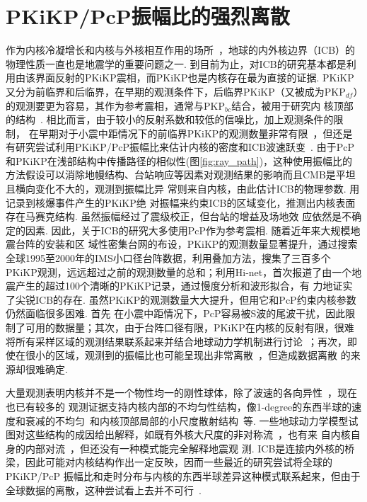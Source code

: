 \section{PKiKP/PcP振幅比的强烈离散}
作为内核冷凝增长和内核与外核相互作用的场所~\citep{Deguen2011,Bergman2010}，地球的内外核边界（ICB）的物理性质一直也是地震学的重要问题之一. 到目前为止，对ICB的研究基本都是利用由该界面反射的PKiKP震相，而PKiKP也是内核存在最为直接的证据. PKiKP又分为前临界和后临界，在早期的观测条件下，后临界PKiKP（又被成为PKP${}_{df}$）的观测要更为容易，其作为参考震相，通常与PKP${}_{bc}$结合，被用于研究内
核顶部的结构~\citep{Tanaka1997}. 相比而言，由于较小的反射系数和较低的信噪比，加上观测条件的限制，
在早期对于小震中距情况下的前临界PKiKP的观测数量非常有限~\citep{Bolt1970}，但还是有研究尝试利用PKiKP/PcP振幅比来估计内核的密度和ICB波速跃变~\citep{Souriau1989,Shearer1990}. 由于PcP和PKiKP在浅部结构中传播路径的相似性(图\ref{fig:ray_path})，这种使用振幅比的
方法假设可以消除地幔结构、台站响应等因素对观测结果的影响而且CMB是平坦且横向变化不大的，观测到振幅比异
常则来自内核，由此估计ICB的物理参数. \citet{Krasnoshchekov2005}用记录到核爆事件产生的PKiKP绝
对振幅来约束ICB的区域变化，推测出内核表面存在马赛克结构. 虽然振幅经过了震级校正，但台站的增益及场地效
应依然是不确定的因素. 因此，关于ICB的研究大多使用PcP作为参考震相. 随着近年来大规模地震台阵的安装和区
域性密集台网的布设，PKiKP的观测数量显著提升，通过搜索全球1995至2000年的IMS小口径台阵数据，利用叠加方法，\citet{Koper2004a}搜集了三百多个PKiKP观测，远远超过之前的观测数量的总和；利用Hi-net，\citet{Kawakatsu2006}首次报道了由一个地震产生的超过100个清晰的PKiKP记录，通过慢度分析和波形拟合，有
力地证实了尖锐ICB的存在. 虽然PKiKP的观测数量大大提升，但用它和PcP约束内核参数仍然面临很多困难. 首先
在小震中距情况下，PcP容易被S波的尾波干扰，因此限制了可用的数据量；其次，由于台阵口径有限，PKiKP在内核的反射有限，很难将所有采样区域的观测结果联系起来并结合地球动力学机制进行讨论~\citep{Tanaka2015a}；再次，即使在很小的区域，观测到的振幅比也可能呈现出非常离散~\citep{Koper2004a}，但造成数据离散
的来源却很难确定. 

大量观测表明内核并不是一个物性均一的刚性球体，除了波速的各向异性~\citep{Wang2015}，现在也已有较多的
观测证据支持内核内部的不均匀性结构，像1-degree的东西半球的速度和衰减的不均匀~\citep{Tanaka1997,Wen2002}和内核顶部局部的小尺度散射结构~\citep{Vidale2000a}等. 一些地球动力学模型试图对这些结构的成因给出解释，如既有外核大尺度的非对称流~\citep{Aubert2008,Gubbins2011}，也有来
自内核自身的内部对流~\citep{Alboussiere2010,Monnereau2010}，但还没有一种模式能完全解释地震观
测. ICB是连接内外核的桥梁，因此可能对内核结构作出一定反映，因而一些最近的研究尝试将全球的PKiKP/PcP
振幅比和走时分布与内核的东西半球差异这种模式联系起来，但由于全球数据的离散，这种尝试看上去并不可行~\citep{Waszek2015a}. 

